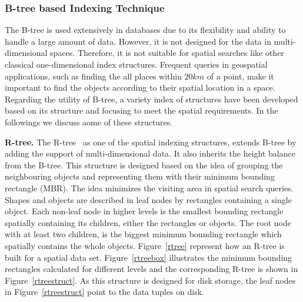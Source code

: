 \documentclass[a4paper,12pt]{article}
\begin{document}
\subsubsection{B-tree based Indexing Technique}
\label{b-tree-based}
The B-tree is used extensively in databases due to its flexibility and ability to handle a large amount of data. However, it is not designed for the data in multi-dimensional spaces. Therefore, it is not suitable for spatial searches like other classical one-dimensional index structures. Frequent queries in geospatial applications, such as finding the all places within $20 km$ of a point, make it important to find the objects according to their spatial location in a space. Regarding the utility of B-tree, a variety index of structures have been developed based on its structure and focusing to meet the spatial requirements. In the followings we discuss aome of these structures.

\textbf{R-tree.} The R-tree~\cite{rtree} as one of the spatial indexing structures, extends B-tree by adding the support of multi-dimensional data. It also inherits the height balance from the B-tree. This structure is designed based on the idea of grouping the neighbouring objects and representing them with their minimum bounding rectangle (MBR). The idea minimizes the visiting area in spatial search queries. Shapes and objects are described in leaf nodes by rectangles containing a single object. Each non-leaf node in higher levels is the smallest bounding rectangle spatially containing its children, either the rectangles or objects. The root node with at least two children, is the biggest minimum bounding rectangle which spatially contains the whole objects. Figure~\ref{rtree} represent how an R-tree is built for a spatial data set. Figure~\ref{rtreebox} illustrates the minimum bounding rectangles calculated for different levels
and the corresponding R-tree is shown in Figure~\ref{rtreestruct}.
As this structure is designed for disk storage, the leaf nodes in Figure~\ref{rtreestruct} point to the data tuples on disk.
\end{document}
